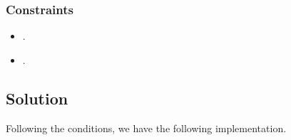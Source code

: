 \documentclass[letterpaper,12pt,english]{book}
\begin{document}
\subsubsection{Constraints}
\label{\detokenize{Array/01_ARR_941_Valid_Mountain_Array:constraints}}\begin{itemize}
\item {} 
\sphinxAtStartPar
{}.

\item {} 
\sphinxAtStartPar
{}.

\end{itemize}


\subsection{Solution}
\label{\detokenize{Array/01_ARR_941_Valid_Mountain_Array:solution}}
\sphinxAtStartPar
Following the conditions, we have the following implementation.
\end{document}
